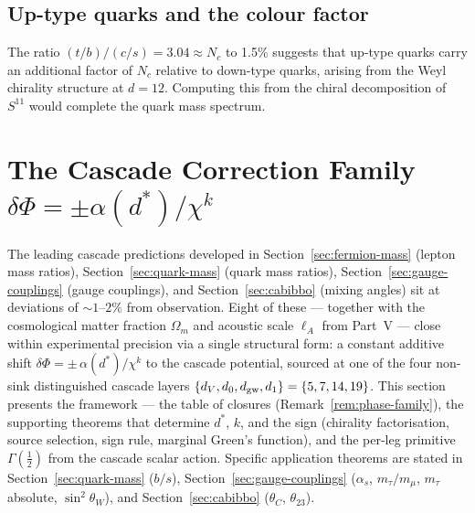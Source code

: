 \documentclass[12pt,a4paper]{article}
\begin{document}
\subsection{Up-type quarks and the colour factor}

The ratio $(t/b)/(c/s) = 3.04 \approx N_c$ to 1.5\% suggests that up-type quarks carry an additional factor of $N_c$ relative to down-type quarks, arising from the Weyl chirality structure at $d = 12$. Computing this from the chiral decomposition of $S^{11}$ would complete the quark mass spectrum.

\section{The Cascade Correction Family \texorpdfstring{$\delta\Phi=\pm\alpha(d^*)/\chi^k$}{delta Phi = +/- alpha(d*)/chi\^{}k}}\label{sec:correction-family}

The leading cascade predictions developed in Section~\ref{sec:fermion-mass} (lepton mass ratios), Section~\ref{sec:quark-mass} (quark mass ratios), Section~\ref{sec:gauge-couplings} (gauge couplings), and Section~\ref{sec:cabibbo} (mixing angles) sit at deviations of $\sim 1$--$2\%$ from observation. Eight of these --- together with the cosmological matter fraction $\Omega_m$ and acoustic scale $\ell_A$ from Part~V --- close within experimental precision via a single structural form: a constant additive shift $\delta\Phi=\pm\,\alpha(d^*)/\chi^k$ to the cascade potential, sourced at one of the four non-sink distinguished cascade layers $\{d_V,d_0,d_{\rm gw},d_1\}=\{5,7,14,19\}$. This section presents the framework --- the table of closures (Remark~\ref{rem:phase-family}), the supporting theorems that determine $d^*$, $k$, and the sign (chirality factorisation, source selection, sign rule, marginal Green's function), and the per-leg primitive $\Gamma(\tfrac{1}{2})$ from the cascade scalar action. Specific application theorems are stated in Section~\ref{sec:quark-mass} ($b/s$), Section~\ref{sec:gauge-couplings} ($\alpha_s$, $m_\tau/m_\mu$, $m_\tau$ absolute, $\sin^2\theta_W$), and Section~\ref{sec:cabibbo} ($\theta_C$, $\theta_{23}$).
\end{document}

